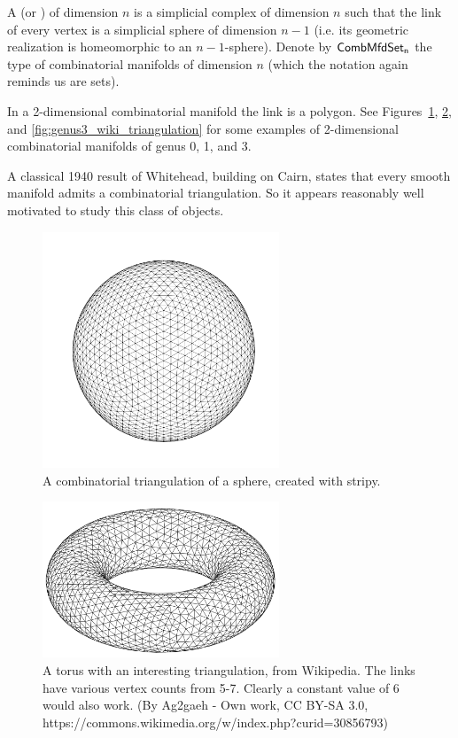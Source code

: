 \begin{mydef}
A  (or ) of dimension \( n \) is a simplicial complex of dimension \( n \) such that the link of every vertex is a simplicial sphere of dimension \( n-1 \) (i.e. its geometric realization is homeomorphic to an \( n-1 \)-sphere). Denote by \( \mathsf{CombMfdSet_n} \) the type of combinatorial manifolds of dimension \( n \) (which the notation again reminds us are sets).
\end{mydef}

In a 2-dimensional combinatorial manifold the link is a polygon. See Figures~\ref{fig:sphere_triangulation}, \ref{fig:torus_wiki_triangulation}, and \ref{fig:genus3_wiki_triangulation} for some examples of 2-dimensional combinatorial manifolds of genus 0, 1, and 3.

A classical 1940 result of Whitehead, building on Cairn, states that every smooth manifold admits a combinatorial triangulation\cite{whitehead_triangulation}. So it appears reasonably well motivated to study this class of objects.

\begin{figure}[htbp]
\centering
\includegraphics[width=200pt]{triangulated_sphere.pdf}
\caption{A combinatorial triangulation of a sphere, created with stripy.}
\label{fig:sphere_triangulation}
\end{figure}

\begin{figure}[htbp]
\centering
\includegraphics[width=200pt]{Torus-triang.png}
\caption{A torus with an interesting triangulation, from Wikipedia. The links have various vertex counts from 5-7. Clearly a constant value of 6 would also work. (By Ag2gaeh - Own work, CC BY-SA 3.0, https://commons.wikimedia.org/w/index.php?curid=30856793)}
\label{fig:torus_wiki_triangulation}
\end{figure}

